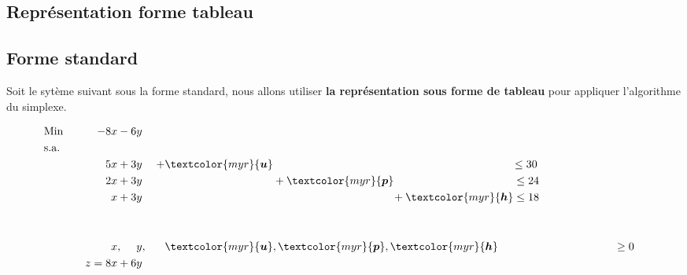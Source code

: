 \documentclass{report}
\begin{document}
\begin{multicols*}{2}

\chapter{Représentation forme tableau }

\section{Forme standard}

Soit le sytème suivant sous la forme standard, nous allons 
utiliser \textbf{la représentation sous forme de tableau} pour appliquer
l'algorithme du simplexe. 

\begin{alignat*}{4}
    &\text{Min} &\quad -8x & - 6y &\\
    &\text{s.a.} \\
    &\phantom{\text{Min}} &\quad 5x & + 3y & 
    + \textcolor{myr}{\boldsymbol{ u}}& 
    \phantom{+ \; \textcolor{myr}{\boldsymbol{ p}}} 
    \phantom{+ \;\textcolor{myr}{\boldsymbol{ h}}} \leq 30 & 
    \\
    &\phantom{\text{Min}} &\quad 2x & + 3y & 
    \phantom{+\textcolor{myr}{\boldsymbol{ u}}}& + 
    \textcolor{myr}{\boldsymbol{ p}} 
    \phantom{+\;\textcolor{myr}{\boldsymbol{ h}}} 
    \leq 24 & \\
    &\phantom{\text{Min}} &\quad x & + 3y & 
    \phantom{+\textcolor{myr}{\boldsymbol{ u}}}&  
    \phantom{+\;\textcolor{myr}{\boldsymbol{ p}}} 
    +\textcolor{myr}{\boldsymbol{ h}} \leq 18 & \\ 
    \\ 
    \\
                &\phantom{\text{Min}} &\quad x &, \phantom{+3} y,& 
    \textcolor{myr}{\boldsymbol{u}}&,
    \textcolor{myr}{\boldsymbol{ p}}, 
    \textcolor{myr}{\boldsymbol{ h}}
    \phantom{+\textcolor{myr}{\boldsymbol{ p}}} \geq 0 & \\
    & \phantom{\text{Min}} &\quad z = 8x & + 6y &
\end{alignat*}



\end{multicols*}
\end{document}
